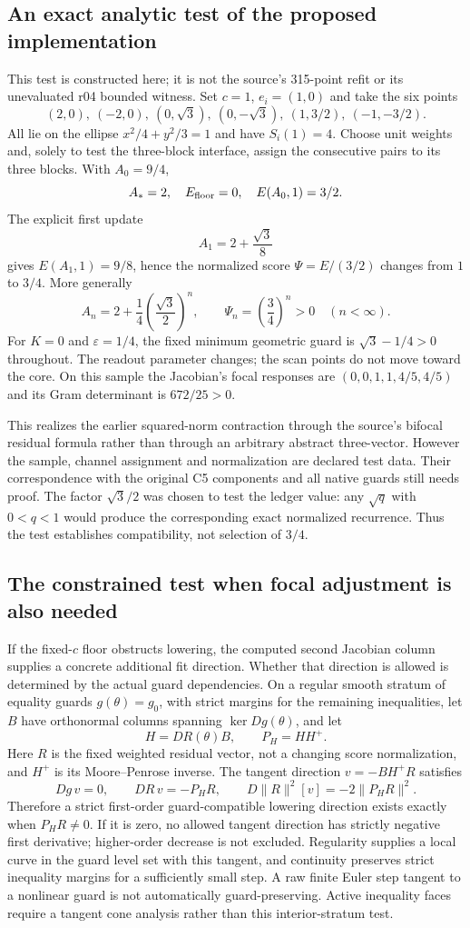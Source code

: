 \documentclass[11pt,a4paper]{article}
\begin{document}
\subsection{An exact analytic test of the proposed implementation}
This test is constructed here; it is not the source's 315-point refit
or its unevaluated r04 bounded witness. Set $c=1$, $e_i=(1,0)$ and take
the six points
\[
 (2,0),\ (-2,0),\ (0,\sqrt3),\ (0,-\sqrt3),\
 (1,3/2),\ (-1,-3/2).
\]
All lie on the ellipse $x^2/4+y^2/3=1$ and have $S_i(1)=4$.
Choose unit weights and, solely to test the three-block interface, assign
the consecutive pairs to its three blocks. With $A_0=9/4$,
\[
 A_*=2,\quad E_{\rm floor}=0,\quad E(A_0,1)=3/2.
\]
The explicit first update
\[
 A_1=2+\frac{\sqrt3}{8}
\]
gives $E(A_1,1)=9/8$, hence the normalized score
$\Psi=E/(3/2)$ changes from $1$ to $3/4$. More generally
\[
 A_n=2+\frac14\left(\frac{\sqrt3}{2}\right)^n,\qquad
 \Psi_n=\left(\frac34\right)^n>0\quad(n<\infty).
\]
For $K=0$ and $\varepsilon=1/4$, the fixed minimum geometric guard is
$\sqrt3-1/4>0$ throughout. The readout parameter changes; the scan
points do not move toward the core. On this sample the Jacobian's focal
responses are $(0,0,1,1,4/5,4/5)$ and its Gram determinant is $672/25>0$.

This realizes the earlier squared-norm contraction through the source's
bifocal residual formula rather than through an arbitrary abstract
three-vector. However the sample, channel assignment and normalization
are declared test data. Their correspondence with the original C5
components and all native guards still needs proof. The factor
$\sqrt3/2$ was chosen to test the ledger value: any $\sqrt q$ with
$0<q<1$ would produce the corresponding exact normalized recurrence.
Thus the test establishes compatibility, not selection of $3/4$.

\subsection{The constrained test when focal adjustment is also needed}
If the fixed-$c$ floor obstructs lowering, the computed second Jacobian
column supplies a concrete additional fit direction. Whether that
direction is allowed is determined by the actual guard dependencies.
On a regular smooth stratum of equality guards $g(\theta)=g_0$, with
strict margins for the remaining inequalities, let $B$ have orthonormal
columns spanning $\ker Dg(\theta)$, and let
\[
 H=DR(\theta)B,\qquad P_H=HH^+.
\]
Here $R$ is the fixed weighted residual vector, not a changing score
normalization, and $H^+$ is its Moore--Penrose inverse. The tangent
direction $v=-BH^+R$ satisfies
\[
 Dg\,v=0,\qquad DR\,v=-P_HR,\qquad
 D\|R\|^2[v]=-2\|P_HR\|^2.
\]
Therefore a strict first-order guard-compatible lowering direction exists
exactly when $P_HR\ne0$. If it is zero, no allowed tangent direction has
strictly negative first derivative; higher-order decrease is not excluded.
Regularity supplies a local curve in the guard level set with this tangent,
and continuity preserves strict inequality margins for a sufficiently
small step. A raw finite Euler step tangent to a nonlinear guard is not
automatically guard-preserving. Active inequality faces require a tangent
cone analysis rather than this interior-stratum test.
\end{document}
